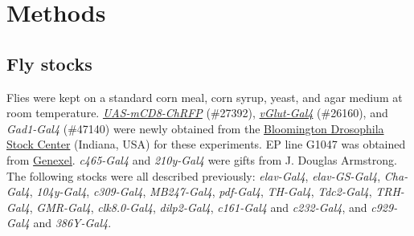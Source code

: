 \section*{Methods}

\subsection*{Fly stocks}

Flies were kept on a standard corn meal, corn syrup, yeast, and agar medium at room temperature.
\href{http://flystocks.bio.indiana.edu/Reports/27392.html}{\emph{UAS-mCD8-ChRFP}} (\#27392), \href{http://flystocks.bio.indiana.edu/Reports/26160.html}{\emph{vGlut-Gal4}} (\#26160), and \emph{Gad1-Gal4} (\#47140) were newly obtained from the \href{http://flystocks.bio.indiana.edu}{Bloomington Drosophila Stock Center} (Indiana, USA) for these experiments.
EP line G1047 was obtained from \href{http://genexel.kaist.ac.kr}{Genexel}.
\emph{c465-Gal4} and \emph{210y-Gal4} were gifts from J. Douglas Armstrong\cite{Young:2010jq}.
The following stocks were all described previously: \emph{elav-Gal4}\cite{Lin:1994vn}, \emph{elav-GS-Gal4}\cite{Osterwalder:2001cl}, \emph{Cha-Gal4}\cite{Kitamoto:2001ue}, \emph{104y-Gal4}\cite{sakai:2006aa}, \emph{c309-Gal4}\cite{connolly:1996aa}, \emph{MB247-Gal4}\cite{zars:2000aa}, \emph{pdf-Gal4}\cite{renn:1999ab}, \emph{TH-Gal4}\cite{friggi-grelin:2003aa}, \emph{Tdc2-Gal4}\cite{alekseyenko:2010aa}, \emph{TRH-Gal4}\cite{alekseyenko:2010aa}, \emph{GMR-Gal4}\cite{freeman:1996aa},  \emph{clk8.0-Gal4}\cite{glossop:2003aa}, \emph{dilp2-Gal4}\cite{Rulifson:2002cg}, \emph{c161-Gal4} and \emph{c232-Gal4}\cite{renn:1999aa}, and \emph{c929-Gal4} and \emph{386Y-Gal4}\cite{taghert:2001aa}.
